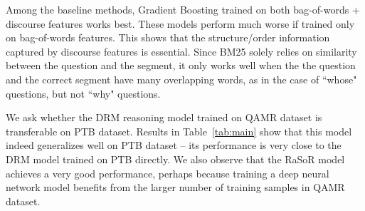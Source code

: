 Among the baseline methods, Gradient Boosting trained on both bag-of-words + discourse features works best. These models perform much worse if trained only on bag-of-words features. This shows that the structure/order information captured by discourse features is essential.
Since BM25 solely relies on similarity between the question and the segment, it only works well when the the question and the correct segment have many overlapping words, as in the case of ``whose" questions, but not ``why" questions.

We ask whether the DRM reasoning model trained on QAMR dataset is transferable on PTB dataset. Results in Table~\ref{tab:main} show that this model indeed generalizes well on PTB dataset -- its performance is very close to the DRM model trained on PTB directly. We also observe that the RaSoR model achieves a very good performance, perhaps because training a deep neural network model benefits from the larger number of training samples in QAMR dataset. 


